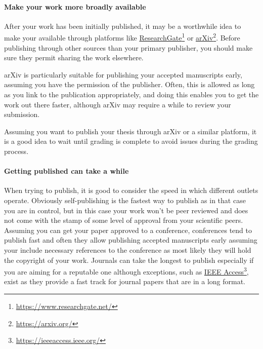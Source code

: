 
\paragraph{Make your work more broadly available}

After your work has been initially published, it may be a worthwhile idea to make your available through platforms like \href{https://www.researchgate.net/}{Research\-Gate}\footnote{\url{https://www.researchgate.net/}} or \href{https://arxiv.org/}{arXiv}\footnote{\url{https://arxiv.org/}}.
Before publishing through other sources than your primary publisher, you should make sure they permit sharing the work elsewhere.

arXiv is particularly suitable for publishing your accepted manuscripts early, assuming you have the permission of the publisher.
Often, this is allowed as long as you link to the publication appropriately, and doing this enables you to get the work out there faster, although arXiv may require a while to review your submission.

Assuming you want to publish your thesis through arXiv or a similar platform, it is a good idea to wait until grading is complete to avoid issues during the grading process.

\paragraph{Getting published can take a while}

When trying to publish, it is good to consider the speed in which different outlets operate.
Obviously self-publishing is the fastest way to publish as in that case you are in control, but in this case your work won't be peer reviewed and does not come with the stamp of some level of approval from your scientific peers.
Assuming you can get your paper approved to a conference, conferences tend to publish fast and often they allow publishing accepted manuscripts early assuming your include necessary references to the conference as most likely they will hold the copyright of your work.
Journals can take the longest to publish especially if you are aiming for a reputable one although exceptions, such as \href{https://ieeeaccess.ieee.org/}{IEEE Access}\footnote{\url{https://ieeeaccess.ieee.org/}}, exist as they provide a fast track for journal papers that are in a long format.

